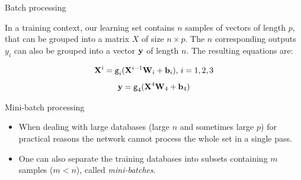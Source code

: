 \documentclass[xcolor=pdftex,dvipsnames,table,mathserif]{beamer}
\begin{document}

\begin{frame}{Batch processing}

  In a training context, our learning set contains $n$ samples of vectors of length $p$, that can be grouped into a matrix $X$ of size $n \times p$. The $n$ corresponding outputs $y_i$ can also be grouped into a vector $\mathbf{y}$ of length $n$. The resulting equations are:

  \begin{block}{}
    \[\mathbf{X}^i = \texttt{g}_i(\mathbf{X}^{i-1}\mathbf{W}_i + \mathbf{b}_i),\, i= 1, 2, 3 \]
    \[\mathbf{y} = \texttt{g}_4(\mathbf{X}^4\mathbf{W}_4 + \mathbf{b}_4)\]
  \end{block}


\end{frame}

\begin{frame}{Mini-batch processing}

  \begin{itemize}[<+->]
  \item   When dealing with large databases (large $n$ and sometimes large $p$) for practical reasons the network cannot process the whole set in a single pass.
  \item   One can also separate the training databases into subsets containing $m$ samples ($m < n$), called \emph{mini-batches}.
\end{itemize}


\end{frame}
\end{document}
